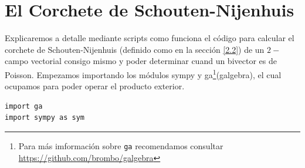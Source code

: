 \documentclass[a4paper,10pt]{book}
\begin{document}
\section{El Corchete de Schouten-Nijenhuis}\label{A.3}
Explicaremos a detalle mediante scripts como funciona el c\'odigo para calcular el corchete de Schouten-Nijenhuis (definido como en la secci\'on \ref{2.2}) de un $2-$campo vectorial consigo mismo y poder determinar cuand un bivector es de Poisson. Empezamos importando los m\'odulos sympy y ga\footnote{Para m\'as imformaci\'on sobre \texttt{ga} recomendamos consultar \url{https://github.com/brombo/galgebra}}(galgebra), el cual ocupamos para poder operar el producto exterior.
\lstset{stepnumber=0}
\begin{lstlisting}
import ga
import sympy as sym
\end{lstlisting}
\end{document}
